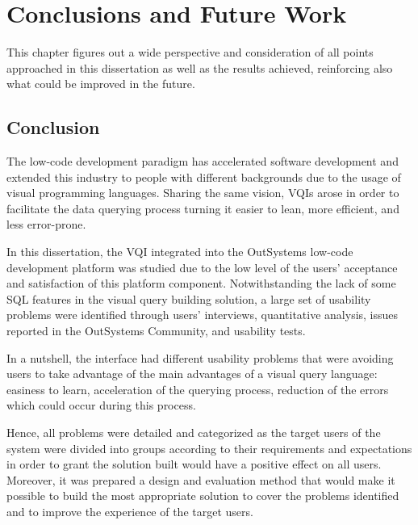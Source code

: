 

\chapter{Conclusions and Future Work}
\label{cha:conclusions_and_future_work}

This chapter figures out a wide perspective and consideration of all points approached in this dissertation as well as the results achieved, reinforcing also what could be improved in the future.

\section{Conclusion}
\label{sec:conclusion}

The low-code development paradigm has accelerated software development and extended this industry to people with different backgrounds due to the usage of visual programming languages. Sharing the same vision, \glspl{VQI} arose in order to facilitate the data querying process turning it easier to lean, more efficient, and less error-prone.

In this dissertation, the \gls{VQI} integrated into the OutSystems low-code development platform was studied due to the low level of the users' acceptance and satisfaction of this platform component. Notwithstanding the lack of some \gls{SQL} features in the visual query building solution, a large set of usability problems were identified through users' interviews, quantitative analysis, issues reported in the OutSystems Community, and usability tests.

In a nutshell, the interface had different usability problems that were avoiding users to take advantage of the main advantages of a visual query language: easiness to learn, acceleration of the querying process, reduction of the errors which could occur during this process. 

Hence, all problems were detailed and categorized as the target users of the system were divided into groups according to their requirements and expectations in order to grant the solution built would have a positive effect on all users. Moreover, it was prepared a design and evaluation method that would make it possible to build the most appropriate solution to cover the problems identified and to improve the experience of the target users.

